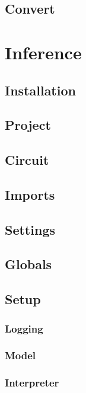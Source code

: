 \documentclass[aspectratio=169]{beamer}
\begin{document}
\subsection{Convert}


\section{Inference}
\subsection{Installation}

\subsection{Project}

\subsection{Circuit}

\subsection{Imports}

\subsection{Settings}

\subsection{Globals}

\subsection{Setup}
\subsubsection{Logging}

\subsubsection{Model}

\subsubsection{Interpreter}

\end{document}
